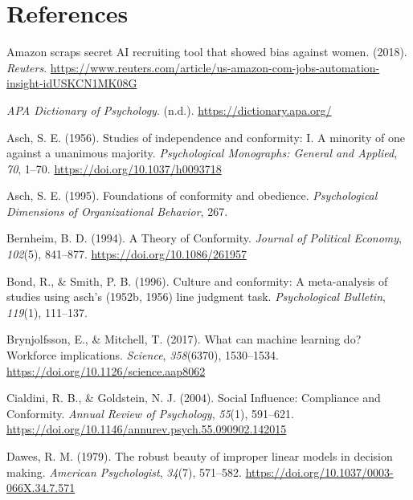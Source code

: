 \documentclass[
  man ,floatsintext]{apa7}
\newlength{\cslhangindent}
\newlength{\cslentryspacingunit} %
\newenvironment{CSLReferences}[2] %
 {%
  \setlength{\parindent}{0pt}
  \ifodd #1
  \let\oldpar\par
  \def\par{\hangindent=\cslhangindent\oldpar}
  \fi
  \setlength{\parskip}{#2\cslentryspacingunit}
 }%
 {}
\begin{document}
\newpage

\hypertarget{references}{%
\section{References}\label{references}}

\hypertarget{refs}{}
\begin{CSLReferences}{1}{0}
\leavevmode{}%
Amazon scraps secret AI recruiting tool that showed bias against women. (2018). \emph{Reuters}. \url{https://www.reuters.com/article/us-amazon-com-jobs-automation-insight-idUSKCN1MK08G}

\leavevmode{}%
\emph{APA Dictionary of Psychology}. (n.d.). \url{https://dictionary.apa.org/}

\leavevmode{}%
Asch, S. E. (1956). Studies of independence and conformity: I. A minority of one against a unanimous majority. \emph{Psychological Monographs: General and Applied}, \emph{70}, 1--70. \url{https://doi.org/10.1037/h0093718}

\leavevmode{}%
Asch, S. E. (1995). Foundations of conformity and obedience. \emph{Psychological Dimensions of Organizational Behavior}, 267.

\leavevmode{}%
Bernheim, B. D. (1994). A Theory of Conformity. \emph{Journal of Political Economy}, \emph{102}(5), 841--877. \url{https://doi.org/10.1086/261957}

\leavevmode{}%
Bond, R., \& Smith, P. B. (1996). Culture and conformity: A meta-analysis of studies using asch's (1952b, 1956) line judgment task. \emph{Psychological Bulletin}, \emph{119}(1), 111--137.

\leavevmode{}%
Brynjolfsson, E., \& Mitchell, T. (2017). What can machine learning do? Workforce implications. \emph{Science}, \emph{358}(6370), 1530--1534. \url{https://doi.org/10.1126/science.aap8062}

\leavevmode{}%
Cialdini, R. B., \& Goldstein, N. J. (2004). Social Influence: Compliance and Conformity. \emph{Annual Review of Psychology}, \emph{55}(1), 591--621. \url{https://doi.org/10.1146/annurev.psych.55.090902.142015}

\leavevmode{}%
Dawes, R. M. (1979). The robust beauty of improper linear models in decision making. \emph{American Psychologist}, \emph{34}(7), 571--582. \url{https://doi.org/10.1037/0003-066X.34.7.571}


\end{CSLReferences}
\end{document}

